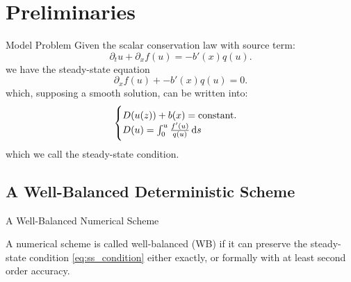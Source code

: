 \documentclass[
    pdf,
    11pt,
    xcolor={svgnames},
  ]{beamer}
\begin{document}
\section{Preliminaries}

\begin{frame}{Model Problem}
    Given the scalar conservation law with source term:
    \begin{equation} \label{eq:model}
        \partial_t u + \partial_x f(u) = -b'(x) q(u).
    \end{equation}
    we have the steady-state equation
    \begin{equation} \label{eq:model_ss}
         \partial_x f(u) + -b'(x) q(u) = 0.
    \end{equation}
    which, supposing a smooth solution, can be written into:
    \begin{equation} \label{eq:ss_condition}
        \begin{cases}
            D(u(z)) + b(x) = {\rm constant}. \\
            D(u) = \int_0^u \frac{f'(u)}{q(u)} \dd{s}
        \end{cases}
    \end{equation}
    which we call the steady-state condition.
\end{frame}

\subsection{A Well-Balanced Deterministic Scheme}
\begin{frame}{A Well-Balanced Numerical Scheme}
    \begin{definition}
        A numerical scheme is called well-balanced (WB) if it can preserve the steady-state condition \eqref{eq:ss_condition} either exactly, or formally with at least second order accuracy.
    \end{definition}
\end{frame}
\end{document}
